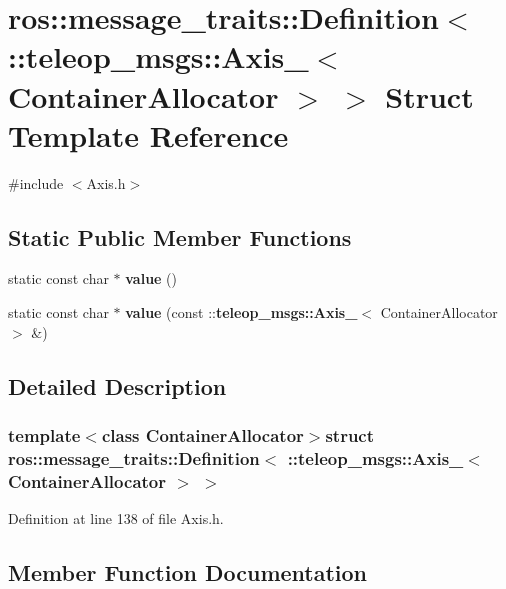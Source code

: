 \section{ros::message\_\-traits::Definition$<$ ::teleop\_\-msgs::Axis\_\-$<$ ContainerAllocator $>$ $>$ Struct Template Reference}
\label{structros_1_1message__traits_1_1Definition_3_01_1_1teleop__msgs_1_1Axis___3_01ContainerAllocator_01_4_01_4}


{\ttfamily \#include $<$Axis.h$>$}

\subsection*{Static Public Member Functions}
\begin{DoxyCompactItemize}
\item 
static const char $\ast$ {\bf value} ()
\item 
static const char $\ast$ {\bf value} (const ::{\bf teleop\_\-msgs::Axis\_\-}$<$ ContainerAllocator $>$ \&)
\end{DoxyCompactItemize}


\subsection{Detailed Description}
\subsubsection*{template$<$class ContainerAllocator$>$struct ros::message\_\-traits::Definition$<$ ::teleop\_\-msgs::Axis\_\-$<$ ContainerAllocator $>$ $>$}



Definition at line 138 of file Axis.h.



\subsection{Member Function Documentation}
